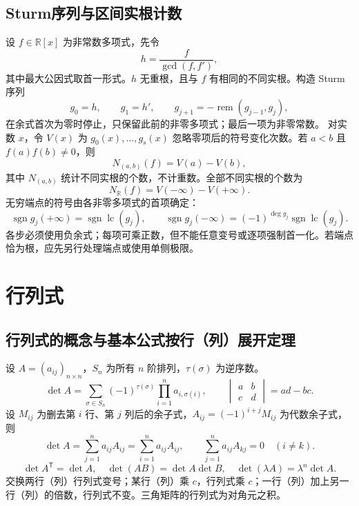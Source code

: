 \documentclass[../main.tex]{subfiles}
\begin{document}
\subsection{Sturm序列与区间实根计数}
设 $f\in\mathbb R[x]$ 为非常数多项式，先令
\[
h=\frac{f}{\gcd(f,f')},
\]
其中最大公因式取首一形式。$h$ 无重根，且与 $f$ 有相同的不同实根。构造 Sturm 序列
\[
g_0=h,\qquad g_1=h',\qquad
g_{j+1}=-\operatorname{rem}(g_{j-1},g_j),
\]
在余式首次为零时停止，只保留此前的非零多项式；最后一项为非零常数。
对实数 $x$，令 $V(x)$ 为 $g_0(x),\ldots,g_s(x)$ 忽略零项后的符号变化次数。若 $a<b$ 且 $f(a)f(b)\ne0$，则
\[
N_{(a,b)}(f)=V(a)-V(b),
\]
其中 $N_{(a,b)}$ 统计不同实根的个数，不计重数。全部不同实根的个数为
\[
N_{\mathbb R}(f)=V(-\infty)-V(+\infty).
\]
无穷端点的符号由各非零多项式的首项确定：
\[
\operatorname{sgn}g_j(+\infty)=\operatorname{sgn}\operatorname{lc}(g_j),\qquad
\operatorname{sgn}g_j(-\infty)=(-1)^{\deg g_j}\operatorname{sgn}\operatorname{lc}(g_j).
\]
各步必须使用负余式；每项可乘正数，但不能任意变号或逐项强制首一化。若端点恰为根，应先另行处理端点或使用单侧极限。
\section{行列式}
\subsection{行列式的概念与基本公式按行（列）展开定理}
设 $A=(a_{ij})_{n\times n}$，$S_n$ 为所有 $n$ 阶排列，$\tau(\sigma)$ 为逆序数。
\[
\det A=\sum_{\sigma\in S_n}(-1)^{\tau(\sigma)}\prod_{i=1}^na_{i,\sigma(i)},\qquad
\begin{vmatrix}a&b\\c&d\end{vmatrix}=ad-bc.
\]
设 $M_{ij}$ 为删去第 $i$ 行、第 $j$ 列后的余子式，$A_{ij}=(-1)^{i+j}M_{ij}$ 为代数余子式，则
\[
\det A=\sum_{j=1}^na_{ij}A_{ij}=\sum_{i=1}^na_{ij}A_{ij},\qquad
\sum_{j=1}^na_{ij}A_{kj}=0\quad(i\ne k).
\]
\[
\det A^{\mathsf T}=\det A,\quad \det(AB)=\det A\det B,\quad
\det(\lambda A)=\lambda^n\det A.
\]
交换两行（列）行列式变号；某行（列）乘 $c$，行列式乘 $c$；一行（列）加上另一行（列）的倍数，行列式不变。三角矩阵的行列式为对角元之积。
\end{document}
